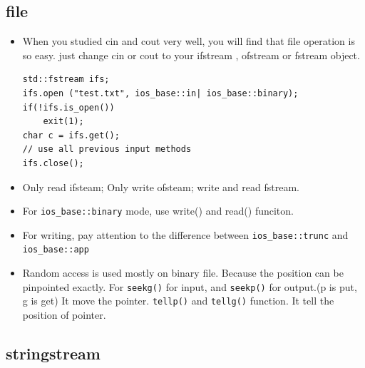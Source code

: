 \documentclass[a4paper,11pt,twoside]{book}
\begin{document}
\subsection{file}
\begin{itemize}
	\item When you studied cin and cout very well, you will find that file operation is so easy. just change cin or cout to your ifstream , ofstream or fstream object.
	
\begin{lstlisting}[numbers=none]
std::fstream ifs;
ifs.open ("test.txt", ios_base::in| ios_base::binary);
if(!ifs.is_open())
	exit(1);
char c = ifs.get();
// use all previous input methods
ifs.close();
\end{lstlisting}
	\item Only read ifsteam;  Only write ofsteam; write and read fstream.
	
	\item For \texttt{ios\_base::binary} mode, use write() and read() funciton.
	
	\item For writing, pay attention to the difference between \texttt{ios\_base::trunc} and \texttt{ios\_base::app}
	
	\item Random access is used mostly on binary file. Because the position can be pinpointed exactly. For \texttt{seekg()} for input, and \texttt{seekp()} for output.(p is put, g is get) It move the pointer. \texttt{tellp()} and \texttt{tellg()} function.  It tell the position of pointer.
	
\end{itemize}

\subsection{stringstream}
\end{document}

